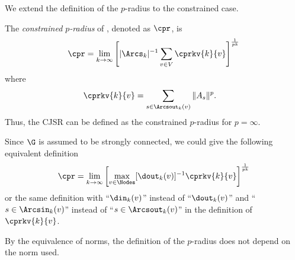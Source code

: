 We extend the definition of the $p$-radius to the constrained case.
\begin{definition}
  The \emph{constrained $p$-radius} of
  , denoted as $\cpr$,
  is
  \begin{equation*}
    \cpr =
    \lim_{k \to \infty} \left[|\Arcs_k|^{-1} \sum_{v \in V} \cprkv{k}{v}\right]^{\frac{1}{pk}}
  \end{equation*}
  where
  \begin{align*}
    \cprkv{k}{v} & =
    \sum_{s \in \Arcsout_k(v)} \|A_s\|^p.
  \end{align*}
  Thus, the CJSR can be defined as the constrained $p$-radius for $p = \infty$.
\end{definition}


\begin{myrem}
  \label{rem:path}
  Since $\G$ is assumed to be strongly connected,
  we could give the following equivalent definition
  \begin{equation}
    \label{eq:cprk2}
    \cpr = \lim_{k \to \infty}
    \left[\max_{v \in \Nodes} [\dout_k(v)]^{-1} \cprkv{k}{v}\right]^{\frac{1}{pk}}
  \end{equation}
  or the same definition with ``$\din_k(v)$'' instead of ``$\dout_k(v)$'' and ``$s \in \Arcsin_k(v)$'' instead of ``$s \in \Arcsout_k(v)$'' in the definition of $\cprkv{k}{v}$.

\end{myrem}

By the equivalence of norms, the definition of the $p$-radius does not depend on the norm used.


